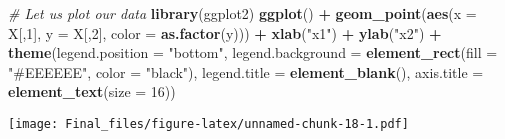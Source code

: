 \documentclass[]{article}
\newenvironment{Shaded}{\begin{snugshade}}{\end{snugshade}}
\newcommand{\CommentTok}[1]{\textcolor[rgb]{0.56,0.35,0.01}{\textit{#1}}}
\newcommand{\DataTypeTok}[1]{\textcolor[rgb]{0.13,0.29,0.53}{#1}}
\newcommand{\DecValTok}[1]{\textcolor[rgb]{0.00,0.00,0.81}{#1}}
\newcommand{\KeywordTok}[1]{\textcolor[rgb]{0.13,0.29,0.53}{\textbf{#1}}}
\newcommand{\NormalTok}[1]{#1}
\newcommand{\OperatorTok}[1]{\textcolor[rgb]{0.81,0.36,0.00}{\textbf{#1}}}
\newcommand{\StringTok}[1]{\textcolor[rgb]{0.31,0.60,0.02}{#1}}
\begin{document}
\begin{Shaded}
\begin{Highlighting}[]
\CommentTok{# Let us plot our data}
\KeywordTok{library}\NormalTok{(ggplot2)}
\KeywordTok{ggplot}\NormalTok{() }\OperatorTok{+}
\StringTok{  }\KeywordTok{geom_point}\NormalTok{(}\KeywordTok{aes}\NormalTok{(}\DataTypeTok{x =}\NormalTok{ X[,}\DecValTok{1}\NormalTok{], }\DataTypeTok{y =}\NormalTok{ X[,}\DecValTok{2}\NormalTok{], }\DataTypeTok{color =} \KeywordTok{as.factor}\NormalTok{(y))) }\OperatorTok{+}
\StringTok{  }\KeywordTok{xlab}\NormalTok{(}\StringTok{"x1"}\NormalTok{) }\OperatorTok{+}\StringTok{ }\KeywordTok{ylab}\NormalTok{(}\StringTok{"x2"}\NormalTok{) }\OperatorTok{+}
\StringTok{  }\KeywordTok{theme}\NormalTok{(}\DataTypeTok{legend.position =} \StringTok{"bottom"}\NormalTok{,}
        \DataTypeTok{legend.background =} \KeywordTok{element_rect}\NormalTok{(}\DataTypeTok{fill =} \StringTok{"#EEEEEE"}\NormalTok{, }\DataTypeTok{color =} \StringTok{"black"}\NormalTok{),}
        \DataTypeTok{legend.title =} \KeywordTok{element_blank}\NormalTok{(),}
        \DataTypeTok{axis.title =} \KeywordTok{element_text}\NormalTok{(}\DataTypeTok{size =} \DecValTok{16}\NormalTok{))}
\end{Highlighting}
\end{Shaded}

\texttt{[image: Final\_files/figure-latex/unnamed-chunk-18-1.pdf]}
\end{document}
